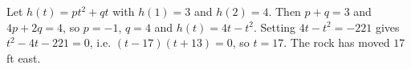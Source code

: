 Let $h(t)=pt^2+qt$ with $h(1)=3$ and $h(2)=4$. Then $p+q=3$ and $4p+2q=4$, so $p=-1$, $q=4$ and $h(t)=4t-t^2$. Setting $4t-t^2=-221$ gives $t^2-4t-221=0$, i.e. $(t-17)(t+13)=0$, so $t=17$. The rock has moved $\boxed{17}$ ft east.
